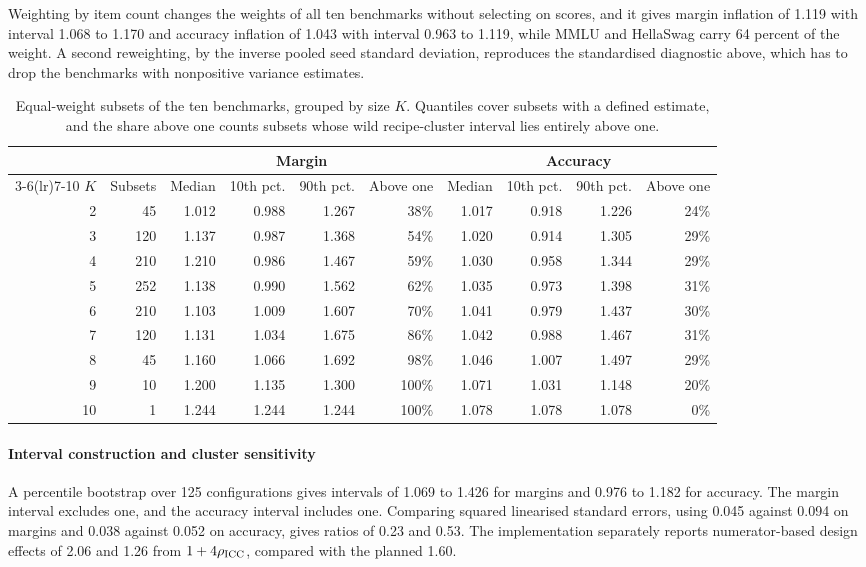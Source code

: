 Weighting by item count changes the weights of all ten benchmarks without selecting on scores, and it gives margin inflation of 1.119 with interval 1.068 to 1.170 and accuracy inflation of 1.043 with interval 0.963 to 1.119, while MMLU and HellaSwag carry 64 percent of the weight. A second reweighting, by the inverse pooled seed standard deviation, reproduces the standardised diagnostic above, which has to drop the benchmarks with nonpositive variance estimates.

\begin{table}[h]
\centering
\small
\caption{Equal-weight subsets of the ten benchmarks, grouped by size $K$. Quantiles cover subsets with a defined estimate, and the share above one counts subsets whose wild recipe-cluster interval lies entirely above one.}
\label{tab:fixedk}
\setlength{\tabcolsep}{4pt}
\begin{tabular}{rrrrrrrrrr}
\toprule
& & \multicolumn{4}{c}{Margin} & \multicolumn{4}{c}{Accuracy} \\
\cmidrule(lr){3-6}\cmidrule(lr){7-10}
$K$ & Subsets & Median & 10th pct. & 90th pct. & Above one & Median & 10th pct. & 90th pct. & Above one \\
\midrule
2 & 45 & 1.012 & 0.988 & 1.267 & 38\% & 1.017 & 0.918 & 1.226 & 24\% \\
3 & 120 & 1.137 & 0.987 & 1.368 & 54\% & 1.020 & 0.914 & 1.305 & 29\% \\
4 & 210 & 1.210 & 0.986 & 1.467 & 59\% & 1.030 & 0.958 & 1.344 & 29\% \\
5 & 252 & 1.138 & 0.990 & 1.562 & 62\% & 1.035 & 0.973 & 1.398 & 31\% \\
6 & 210 & 1.103 & 1.009 & 1.607 & 70\% & 1.041 & 0.979 & 1.437 & 30\% \\
7 & 120 & 1.131 & 1.034 & 1.675 & 86\% & 1.042 & 0.988 & 1.467 & 31\% \\
8 & 45 & 1.160 & 1.066 & 1.692 & 98\% & 1.046 & 1.007 & 1.497 & 29\% \\
9 & 10 & 1.200 & 1.135 & 1.300 & 100\% & 1.071 & 1.031 & 1.148 & 20\% \\
10 & 1 & 1.244 & 1.244 & 1.244 & 100\% & 1.078 & 1.078 & 1.078 & 0\% \\
\bottomrule
\end{tabular}
\end{table}

\paragraph{Interval construction and cluster sensitivity}
A percentile bootstrap over 125 configurations gives intervals of 1.069 to 1.426 for margins and 0.976 to 1.182 for accuracy. The margin interval excludes one, and the accuracy interval includes one. Comparing squared linearised standard errors, using 0.045 against 0.094 on margins and 0.038 against 0.052 on accuracy, gives ratios of 0.23 and 0.53. The implementation separately reports numerator-based design effects \citep{kish1965} of 2.06 and 1.26 from $1+4\rho_{\rm ICC}$, compared with the planned 1.60.

